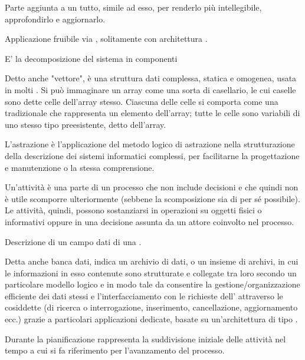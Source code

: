 {
{Parte aggiunta a un tutto, simile ad esso, per renderlo più intellegibile, approfondirlo e aggiornarlo.}

{Applicazione fruibile via , solitamente con architettura .}

{E' la decomposizione del sistema in componenti}
 
{Detto anche "vettore", è una struttura dati complessa, statica e omogenea, usata in molti . Si può immaginare un array come una sorta di casellario, le cui caselle sono dette celle dell'array stesso. Ciascuna delle celle si comporta come una  tradizionale che rappresenta un elemento dell'array; tutte le celle sono variabili di uno stesso tipo preesistente, detto  dell'array.}

{L'astrazione è l'applicazione del metodo logico di astrazione nella strutturazione della descrizione dei sistemi informatici complessi, per facilitarne la progettazione e manutenzione o la stessa comprensione.}

{Un'attività è una parte di un processo che non include decisioni e che quindi non è utile scomporre ulteriormente (sebbene la scomposizione sia di per sé possibile). Le attività, quindi, possono sostanziarsi in operazioni su oggetti fisici o informativi oppure in una decisione assunta da un attore coinvolto nel processo.}

{Descrizione di un campo dati di una .}




{Detta anche banca dati, indica un archivio di dati, o un insieme di archivi, in cui le informazioni in esso contenute sono strutturate e collegate tra loro secondo un particolare modello logico e in modo tale da consentire la gestione/organizzazione efficiente dei dati stessi e l'interfacciamento con le richieste dell' attraverso le cosiddette  (di ricerca o interrogazione, inserimento, cancellazione, aggiornamento ecc.) grazie a particolari applicazioni  dedicate, basate su un'architettura di tipo .}

{Durante la pianificazione rappresenta la suddivisione iniziale delle attività nel tempo a cui si fa riferimento per l'avanzamento del processo.}

}
